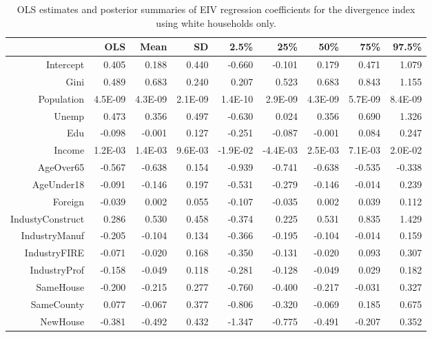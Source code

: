 \documentclass[12pt]{article}
\begin{document}
\begin{table}[ht]
\centering
\begin{tabular}{rrrrrrrrr}
  \hline
 & OLS & Mean & SD & 2.5\% & 25\% & 50\% & 75\% & 97.5\% \\ 
  \hline
Intercept & 0.405 & 0.188 & 0.440 & -0.660 & -0.101 & 0.179 & 0.471 & 1.079 \\ 
  Gini & 0.489 & 0.683 & 0.240 & 0.207 & 0.523 & 0.683 & 0.843 & 1.155 \\ 
  Population & 4.5E-09 & 4.3E-09 & 2.1E-09 & 1.4E-10 & 2.9E-09 & 4.3E-09 & 5.7E-09 & 8.4E-09 \\ 
  Unemp & 0.473 & 0.356 & 0.497 & -0.630 & 0.024 & 0.356 & 0.690 & 1.326 \\ 
  Edu & -0.098 & -0.001 & 0.127 & -0.251 & -0.087 & -0.001 & 0.084 & 0.247 \\ 
  Income & 1.2E-03 & 1.4E-03 & 9.6E-03 & -1.9E-02 & -4.4E-03 & 2.5E-03 & 7.1E-03 & 2.0E-02 \\ 
  AgeOver65 & -0.567 & -0.638 & 0.154 & -0.939 & -0.741 & -0.638 & -0.535 & -0.338 \\ 
  AgeUnder18 & -0.091 & -0.146 & 0.197 & -0.531 & -0.279 & -0.146 & -0.014 & 0.239 \\ 
  Foreign & -0.039 & 0.002 & 0.055 & -0.107 & -0.035 & 0.002 & 0.039 & 0.112 \\ 
  IndustyConstruct & 0.286 & 0.530 & 0.458 & -0.374 & 0.225 & 0.531 & 0.835 & 1.429 \\ 
  IndustryManuf & -0.205 & -0.104 & 0.134 & -0.366 & -0.195 & -0.104 & -0.014 & 0.159 \\ 
  IndustryFIRE & -0.071 & -0.020 & 0.168 & -0.350 & -0.131 & -0.020 & 0.093 & 0.307 \\ 
  IndustryProf & -0.158 & -0.049 & 0.118 & -0.281 & -0.128 & -0.049 & 0.029 & 0.182 \\ 
  SameHouse & -0.200 & -0.215 & 0.277 & -0.760 & -0.400 & -0.217 & -0.031 & 0.327 \\ 
  SameCounty & 0.077 & -0.067 & 0.377 & -0.806 & -0.320 & -0.069 & 0.185 & 0.675 \\ 
  NewHouse & -0.381 & -0.492 & 0.432 & -1.347 & -0.775 & -0.491 & -0.207 & 0.352 \\ 
   \hline
\end{tabular}
\caption{OLS estimates and posterior summaries of EIV regression coefficients for the divergence index using white households only.}
\label{tab:eiv.kl.raw.white}
\end{table}


\clearpage


\end{document}
